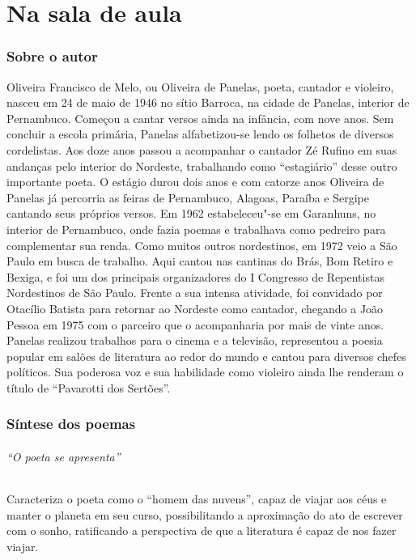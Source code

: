 \part{Na sala de aula}

\paginabranca

\section{Sobre o autor}

Oliveira Francisco de Melo, ou Oliveira de Panelas, poeta, 
cantador e violeiro, nasceu em 24 de maio de 1946 no sítio 
Barroca, na cidade de Panelas, interior de Pernambuco. 
Começou a cantar versos ainda
na infância, com nove anos. Sem concluir a escola primária, Panelas
alfabetizou-se lendo os folhetos de diversos cordelistas. Aos doze anos
passou a acompanhar o cantador Zé Rufino em suas andanças pelo interior
do Nordeste, trabalhando como ``estagiário'' desse outro
importante poeta. O estágio durou dois anos e com catorze anos Oliveira de Panelas
já percorria
as feiras de Pernambuco, Alagoas, Paraíba e Sergipe cantando seus
próprios versos. Em 1962 estabeleceu"-se em Garanhuns, no interior
de Pernambuco, onde fazia poemas e trabalhava como pedreiro para
complementar sua renda. Como muitos outros nordestinos, em 1972 veio a
São Paulo em busca de trabalho. Aqui cantou nas cantinas do Brás, Bom
Retiro e Bexiga, e foi um dos principais organizadores do I Congresso
de Repentistas Nordestinos de São Paulo. Frente a sua intensa atividade,
foi convidado por Otacílio Batista para retornar ao Nordeste como
cantador, chegando a João Pessoa em 1975 com o parceiro que o
acompanharia por mais de vinte anos. Panelas realizou trabalhos para o
cinema e a televisão, representou a poesia popular em salões de
literatura ao redor do mundo e cantou para diversos chefes políticos.
Sua poderosa voz e sua habilidade como violeiro ainda lhe renderam o
título de ``Pavarotti dos Sertões''.


\section{Síntese dos poemas}

\medskip

\paragraph{``O poeta se apresenta''}

Caracteriza o poeta como o ``homem das
nuvens'', capaz de viajar aos céus e manter o planeta
em seu curso, possibilitando a aproximação do ato de escrever com o
sonho, ratificando a perspectiva de que a literatura é capaz de nos
fazer viajar.
 
